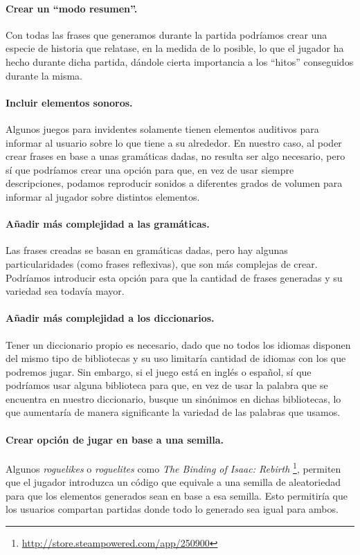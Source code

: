 \paragraph{Crear un ``modo resumen''.} Con todas las frases que generamos durante la partida podríamos crear una especie de historia que relatase, en la medida de lo posible, lo que el jugador ha hecho durante dicha partida, dándole cierta importancia a los ``hitos'' conseguidos durante la misma.

\paragraph{Incluir elementos sonoros.} Algunos juegos para invidentes solamente tienen elementos auditivos para informar al usuario sobre lo que tiene a su alrededor. En nuestro caso, al poder crear frases en base a unas gramáticas dadas, no resulta ser algo necesario, pero sí que podríamos crear una opción para que, en vez de usar siempre descripciones, podamos reproducir sonidos a diferentes grados de volumen para informar al jugador sobre distintos elementos.

\paragraph{Añadir más complejidad a las gramáticas.} Las frases creadas se basan en gramáticas dadas, pero hay algunas particularidades (como frases reflexivas), que son más complejas de crear. Podríamos introducir esta opción para que la cantidad de frases generadas y su variedad sea todavía mayor. 

\paragraph{Añadir más complejidad a los diccionarios.} Tener un diccionario propio es necesario, dado que no todos los idiomas disponen del mismo tipo de bibliotecas y su uso limitaría cantidad de idiomas con los que podremos jugar. Sin embargo, si el juego está en inglés o español, sí que podríamos usar alguna biblioteca para que, en vez de usar la palabra que se encuentra en nuestro diccionario, busque un sinónimos en dichas bibliotecas, lo que aumentaría de manera significante la variedad de las palabras que usamos. 

\paragraph{Crear opción de jugar en base a una semilla.} Algunos \textit{roguelikes} o \textit{roguelites} como \textit{The Binding of Isaac: Rebirth} \footnote{\url{http://store.steampowered.com/app/250900}}, permiten que el jugador introduzca un código que equivale a una semilla de aleatoriedad para que los elementos generados sean en base a esa semilla. Esto permitiría que los usuarios compartan partidas donde todo lo generado sea igual para ambos.